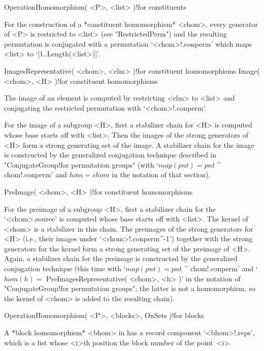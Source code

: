 \stars

\>OperationHomomorphism( <P>, <list> )!{for constituents}

For the   construction  of  a  *constituent  homomorphism* <chom>,  every
generator of  <P> is restricted to  <list> (see "RestrictedPerm") and the
resulting permutation  is conjugated with a permutation `<chom>!.conperm'
which maps <list> to `[1..Length(<list>)]'.

\>ImagesRepresentative( <chom>, <elm> )!{for constituent homomorphisms}
\>Image( <chom>, <H> )!{for constituent homomorphisms}

The image  of an element is  computed by restricting  <elm> to <list> and
conjugating the restricted permutation with `<chom>!.conperm'.

For  the image of  a subgroup <H>, first  a  stabilizer chain  for <H> is
computed whose base starts off with <list>. Then the images of the strong
generators of <H> form a strong generating set of the image. A stabilizer
chain for  the  image   is constructed   by the generalized   conjugation
technique described  in   "ConjugateGroup!for permutation  groups"  (with
`$map(pnt) =  pnt$ ^ chom!.conperm' and $hom  = chom$ in the  notation of
that section).

\>PreImage( <chom>, <H> )!{for constituent homomorphisms}

For  the preimage of a subgroup  <H>,  first a  stabilizer  chain for the
`<chom>.source' is computed whose base starts off with <list>. The kernel
of <chom> is  a stabilizer in  this chain.  The  preimages of the  strong
generators for    <H> (i.e.,  their  images  under  `<chom>!.conperm^-1')
together  with  the strong  generators   for  the  kernel form  a  strong
generating set of the preimage of <H>. Again,  a stabilizer chain for the
preimage  is constructed by  the  generalized conjugation technique (this
time   with  `$map(pnt) =   pnt$   ^  chom!.conperm'   and `$hom(h)    =$
PreImagesRepresentative(   <chom>,   <h>    )'  in   the     notation  of
"ConjugateGroup!for  permutation   groups";   the   latter  is  not     a
homomorphism, so the kernel of <chom> is added to the resulting chain).

\stars

\>OperationHomomorphism( <P>, <blocks>, OnSets )!{for blocks}

A  *block   homomorphism* <bhom>  in   {\GAP}    has a record   component
`<bhom>!.reps', which is a list whose  <i>th position the block number of
the point~<i>.

